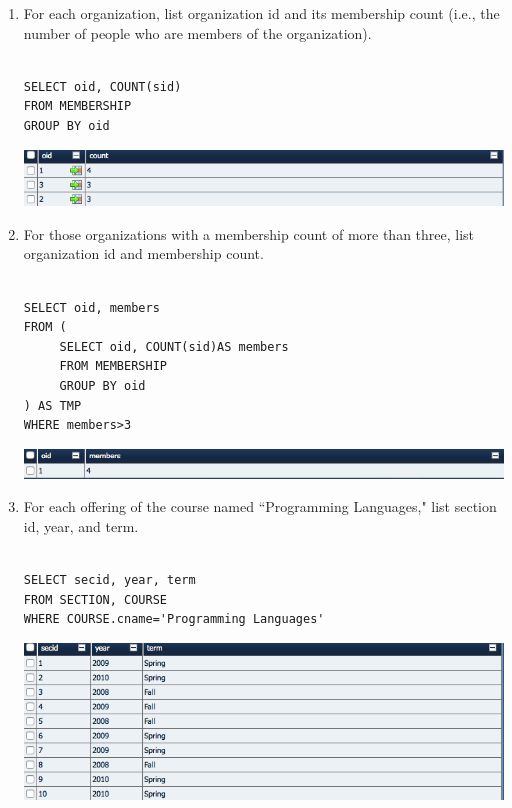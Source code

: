 \documentclass[11pt]{article}
\begin{document}
\begin{enumerate}
\item For each organization, list organization id and its membership count (i.e., the number of people who are members of the organization).

\begin{verbatim}

SELECT oid, COUNT(sid)
FROM MEMBERSHIP
GROUP BY oid

\end{verbatim}

\includegraphics[scale=0.5]{28.png}

\item For those organizations with a membership count of more than three, list organization id and membership count.

\begin{verbatim}

SELECT oid, members
FROM (
     SELECT oid, COUNT(sid)AS members 
     FROM MEMBERSHIP
     GROUP BY oid
) AS TMP
WHERE members>3

\end{verbatim}

\includegraphics[scale=0.5]{29.png}

\item For each offering of the course named ``Programming Languages," list section id, year, and term.

\begin{verbatim}

SELECT secid, year, term
FROM SECTION, COURSE
WHERE COURSE.cname='Programming Languages'

\end{verbatim}

\includegraphics[scale=0.5]{30.png}


\end{enumerate}
\end{document}
